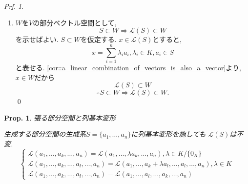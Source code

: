 \documentclass[a4paper,10pt,report]{amsart}
\theoremstyle{plain}
\newtheorem{prop}{Prop.}[section]
\theoremstyle{definition}
\theoremstyle{remark}
\newtheorem{prf}{Prf.}
\begin{document}
\begin{prf}
\begin{enumerate}
\begin{equation*}
        \end{equation*}
        \(\mathcal{L}(S)\)の定義より\(\lambda x+\mu y\in W\)だから
        \begin{equation*}
            x,y\in W\wedge\lambda,\mu\in K\Rightarrow \lambda x+\mu y\in W
        \end{equation*}
        また, 
        \begin{equation*}
            0_{V}=\sum_{i=1}^{n}0_{K}a_{i}\in W
        \end{equation*}
        以上より\cref{prop::NSC_for_linear_subspace_2}から\(W\)は部分ベクトル空間. 
        \qed{}
        \item \(W\)を\(V\)の部分ベクトル空間として, 
        \begin{equation*}
            S\subset W\Rightarrow \mathcal{L}(S)\subset W
        \end{equation*}
        を示せばよい. \(S\subset W\)を仮定する. \(x\in\mathcal{L}(S)\)とすると, 
        \begin{equation*}
            x=\sum_{i=1}^{n}\lambda_{i}a_{i},\lambda_{i}\in K,a_{i}\in S
        \end{equation*}
        と表せる. \cref{cor::a_linear_combination_of_vectors_is_also_a_vector}より, 
        \(x\in W\)だから
        \begin{equation*}
            \mathcal{L}(S)\subset W
        \end{equation*}
        \begin{equation*}
            \therefore S\subset W\Rightarrow \mathcal{L}(S)\subset W. 
        \end{equation*}
        \qed{}
    \end{enumerate}
\end{prf}
\begin{leftbar}
    \begin{prop}張る部分空間と列基本変形\par
        生成する部分空間の生成系\(S=\{a_{1},\dots,a_{n}\} \)に列基本変形を施しても
        \(\mathcal{L}(S)\)は不変.
        \begin{equation}
            \begin{cases}
                \mathcal{L}(a_{1},\dots,a_{k},\dots,a_{n})=\mathcal{L}(a_{1},\dots,\lambda a_{k},\dots,a_{n}),\lambda\in K/\{0_{K}\} \\
                \mathcal{L}(a_{1},\dots,a_{k},\dots,a_{l},\dots,a_{n})=\mathcal{L}(a_{1},\dots,a_{k}+\lambda a_{l},\dots,a_{l},\dots,a_{n}),\lambda\in K\\
                \mathcal{L}(a_{1},\dots,a_{k},\dots,a_{l},\dots,a_{n})=\mathcal{L}(a_{1},\dots,a_{l},\dots,a_{k},\dots,a_{n})
            \end{cases}
        \end{equation}
    \end{prop}
\end{leftbar}
\end{document}
